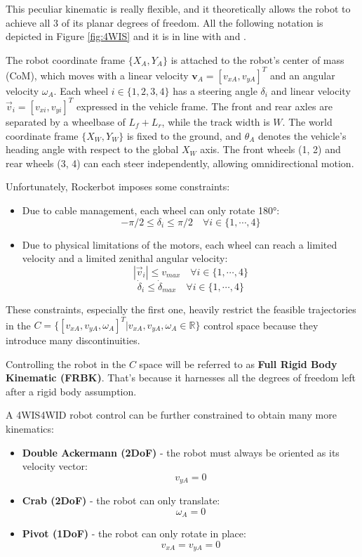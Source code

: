 \documentclass[11pt,a4paper,twocolumn]{article}
\begin{document}
This peculiar kinematic is really flexible, and it theoretically allows the robot to achieve all 3 of its planar degrees of freedom. All the following notation is depicted in Figure \ref{fig:4WIS} and it is in line with \cite{4WIS4WID} and \cite{4WISschematic}.

The robot coordinate frame $\{X_A, Y_A\}$ is attached to the robot's center of mass (CoM), which moves with a linear velocity $\mathbf{v}_A = [v_{xA}, v_{yA}]^T$ and an angular velocity $\omega_A$. 
Each wheel $i \in \{1, 2, 3, 4\}$ has a steering angle $\delta_i$ and linear velocity $\vec{v}_i = [v_{xi}, v_{yi}]^T$ expressed in the vehicle frame. 
The front and rear axles are separated by a wheelbase of $L_f + L_r$, while the track width is $W$. 
The world coordinate frame $\{X_W, Y_W\}$ is fixed to the ground, and $\theta_A$ denotes the vehicle's heading angle with respect to the global $X_W$ axis. 
The front wheels (1, 2) and rear wheels (3, 4) can each steer independently, allowing omnidirectional motion.

Unfortunately, Rockerbot imposes some constraints:
\begin{itemize}
    \item Due to cable management, each wheel can only rotate 180°: 
    $$
    -\pi/2 \leq \delta_i \leq \pi/2 \quad \forall i \in \{1, \cdots, 4\}
    $$
    \item Due to physical limitations of the motors, each wheel can reach a limited velocity and a limited zenithal angular velocity:
    $$
    |\vec{v}_i| \leq v_{max} \quad \forall i \in \{1, \cdots, 4\}
    $$
    $$
    \dot{\delta}_i \leq \dot{\delta}_{max} \quad \forall i \in \{1, \cdots, 4\}
    $$
\end{itemize}

These constraints, especially the first one, heavily restrict the feasible trajectories in the $C = \{[v_{xA}, v_{yA}, \omega_A]^T|v_{xA}, v_{yA}, \omega_A \in \mathbb{R}\}$ control space because they introduce many discontinuities.

Controlling the robot in the $C$ space will be referred to as \textbf{Full Rigid Body Kinematic (FRBK)}. That's because it harnesses all the degrees of freedom left after a rigid body assumption.

A 4WIS4WID robot control can be further constrained to obtain many more kinematics:
\begin{itemize}
    \item \textbf{Double Ackermann (2DoF)} - the robot must always be oriented as its velocity vector:
    $$
    v_{yA} = 0
    $$

    \item \textbf{Crab (2DoF)} - the robot can only translate:
    $$
    \omega_{A} = 0
    $$

    \item \textbf{Pivot (1DoF)} - the robot can only rotate in place:
    $$
    v_{xA} = v_{yA} = 0
    $$
\end{itemize}
\end{document}
